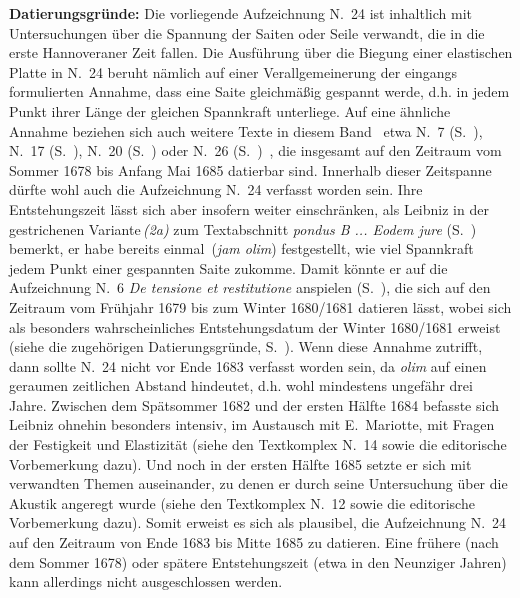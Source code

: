 \begin{ledgroup}%
\footnotesize%
\pstart%
\noindent%
\textbf{Datierungsgründe:}
Die vorliegende Aufzeichnung N.~24 ist inhaltlich mit Untersuchungen über die Spannung der Saiten oder Seile verwandt, die in die erste Hannoveraner Zeit fallen.
Die Ausführung über die Biegung einer elastischen Platte in N.~24 beruht nämlich auf einer Verallgemeinerung der eingangs formulierten Annahme, dass eine Saite gleichmäßig gespannt werde, d.h. in jedem Punkt ihrer Länge der gleichen Spannkraft unterliege.
Auf eine ähnliche Annahme beziehen sich auch weitere Texte in diesem Band \textendash\ etwa N.~7 (S.~), N.~17 (S.~), N.~20 (S.~) oder N.~26 (S.~)~\textendash, die insgesamt auf den Zeitraum vom Sommer 1678 bis Anfang Mai 1685 datierbar sind.
Innerhalb dieser Zeitspanne dürfte wohl auch die Aufzeichnung N.~24 verfasst worden sein.
Ihre Entstehungszeit lässt sich aber insofern weiter einschränken, als Leibniz in der gestrichenen Variante\,\textit{(2a)} zum Textabschnitt \textit{pondus B ... Eodem jure} (S.~) bemerkt, er habe \glqq bereits einmal\grqq\ (\textit{jam olim}) festgestellt, wie viel Spannkraft jedem Punkt einer gespannten Saite zukomme.
Damit könnte er auf die Aufzeichnung N.~6 \textit{De tensione et restitutione} anspielen (S.~), die sich auf den Zeitraum vom Frühjahr 1679 bis zum Winter 1680/1681 datieren lässt, wobei sich als besonders wahrscheinliches Entstehungsdatum der Winter 1680/1681 erweist (siehe die zugehörigen Datierungsgründe, S.~\pageref{LH_35_09_15_001,022_Datierung}). 
Wenn diese Annahme zutrifft, dann sollte N.~24 nicht vor Ende 1683 verfasst worden sein, da \textit{olim} auf einen geraumen zeitlichen Abstand hindeutet, d.h. wohl mindestens ungefähr drei Jahre.
Zwischen dem Spätsommer 1682 und der ersten Hälfte 1684 befasste sich Leibniz ohnehin besonders intensiv, im Austausch mit E.~Mariotte,\protect{} mit Fragen der Festigkeit und Elastizität (siehe den Textkomplex N.~14 sowie die editorische Vorbemerkung dazu). %
Und noch in der ersten Hälfte 1685 setzte er sich mit verwandten Themen auseinander, zu denen er durch seine Untersuchung über die Akustik angeregt wurde (siehe den Textkomplex N.~12 sowie die editorische Vorbemerkung dazu).
Somit erweist es sich als plausibel, die Aufzeichnung N.~24 auf den Zeitraum von Ende 1683 bis Mitte 1685 zu datieren.
Eine frühere (nach dem Sommer 1678) oder spätere Entstehungszeit (etwa in den Neunziger Jahren) kann allerdings nicht ausgeschlossen werden. 
\pend%
\end{ledgroup}%
